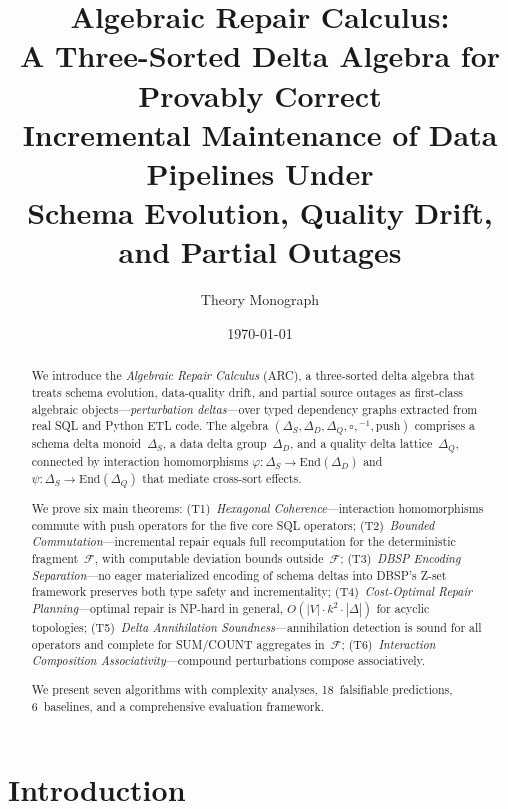 \documentclass[11pt,a4paper]{article}
\title{Algebraic Repair Calculus:\\[4pt]
\large A Three-Sorted Delta Algebra for Provably Correct\\
Incremental Maintenance of Data Pipelines Under\\
Schema Evolution, Quality Drift, and Partial Outages}
\author{Theory Monograph}
\date{\today}
\theoremstyle{definition}
\newcommand{\DeltaS}{\Delta_{\!S}}
\newcommand{\DeltaD}{\Delta_{\!D}}
\newcommand{\DeltaQ}{\Delta_{\!Q}}
\newcommand{\push}{\mathrm{push}}
\newcommand{\FragF}{\mathcal{F}}
\begin{document}
\maketitle

\begin{abstract}
We introduce the \emph{Algebraic Repair Calculus} (ARC), a three-sorted delta
algebra that treats schema evolution, data-quality drift, and partial source
outages as first-class algebraic objects---\emph{perturbation deltas}---over
typed dependency graphs extracted from real SQL and Python ETL code.  The algebra
$(\DeltaS, \DeltaD, \DeltaQ, \circ, {}^{-1}, \push)$ comprises a schema delta
monoid~$\DeltaS$, a data delta group~$\DeltaD$, and a quality delta
lattice~$\DeltaQ$, connected by interaction homomorphisms
$\varphi\colon \DeltaS \to \mathrm{End}(\DeltaD)$ and
$\psi\colon \DeltaS \to \mathrm{End}(\DeltaQ)$ that mediate cross-sort effects.

We prove six main theorems:
(T1)~\emph{Hexagonal Coherence}---interaction homomorphisms commute with push
operators for the five core SQL operators;
(T2)~\emph{Bounded Commutation}---incremental repair equals full recomputation
for the deterministic fragment~$\FragF$, with computable deviation bounds
outside~$\FragF$;
(T3)~\emph{DBSP Encoding Separation}---no eager materialized encoding of schema
deltas into DBSP's Z-set framework preserves both type safety and incrementality;
(T4)~\emph{Cost-Optimal Repair Planning}---optimal repair is NP-hard in general,
$O(|V| \cdot k^2 \cdot |\Delta|)$ for acyclic topologies;
(T5)~\emph{Delta Annihilation Soundness}---annihilation detection is sound for
all operators and complete for SUM/COUNT aggregates in~$\FragF$;
(T6)~\emph{Interaction Composition Associativity}---compound perturbations
compose associatively.

We present seven algorithms with complexity analyses, 18~falsifiable predictions,
6~baselines, and a comprehensive evaluation framework.
\end{abstract}

\tableofcontents
\newpage

\section{Introduction}
\label{sec:intro}
\end{document}
